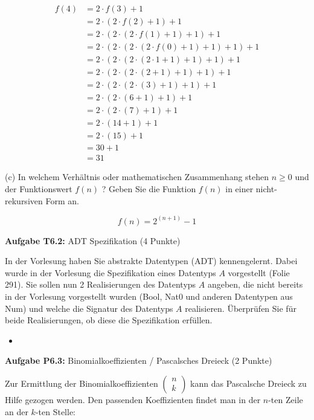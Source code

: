 $$
\begin{aligned}
f(4) &=2 \cdot f(3)+1 \\
&=2 \cdot(2 \cdot f(2)+1)+1 \\
&=2 \cdot(2 \cdot(2 \cdot f(1)+1)+1)+1 \\
&=2 \cdot(2 \cdot(2 \cdot(2 \cdot f(0)+1)+1)+1)+1 \\
&=2 \cdot(2 \cdot(2 \cdot(2 \cdot 1+1)+1)+1)+1 \\
&=2 \cdot(2 \cdot(2 \cdot(2+1)+1)+1)+1 \\
&=2 \cdot(2 \cdot(2 \cdot(3)+1)+1)+1 \\
&=2 \cdot(2 \cdot(6+1)+1)+1 \\
&=2 \cdot(2 \cdot(7)+1)+1 \\
&=2 \cdot(14+1)+1 \\
&=2 \cdot(15)+1 \\
&=30+1 \\
&=31
\end{aligned}
$$

(c) In welchem Verhältnis oder mathematischen Zusammenhang stehen $n \geq 0$ und der Funktionswert $f(n)$ ? Geben Sie die Funktion $f(n)$ in einer nicht-rekursiven Form an.

$$
f(n)=2^{(n+1)}-1
$$

\newpage

\textbf{Aufgabe T6.2:} ADT Spezifikation (4 Punkte)

In der Vorlesung haben Sie abstrakte Datentypen (ADT) kennengelernt. Dabei wurde in der Vorlesung die Spezifikation eines Datentyps $A$ vorgestellt (Folie 291). Sie sollen nun 2 Realisierungen des Datentyps $A$ angeben, die nicht bereits in der Vorlesung vorgestellt wurden (Bool, Nat0 und anderen Datentypen aus Num) und welche die Signatur des Datentyps $A$ realisieren. Überprüfen Sie für beide Realisierungen, ob diese die Spezifikation erfüllen.

\begin{itemize}
  \item []\inputminted{Haskell}{A6_2.hs}
\end{itemize}

\newpage

\textbf{Aufgabe P6.3:} Binomialkoeffizienten / Pascalsches Dreieck (2 Punkte)

Zur Ermittlung der Binomialkoeffizienten $\left(\begin{array}{l}n \\ k\end{array}\right)$ kann das Pascalsche Dreieck zu Hilfe gezogen werden. Den passenden Koeffizienten findet man in der $n$-ten Zeile an der $k$-ten Stelle:

